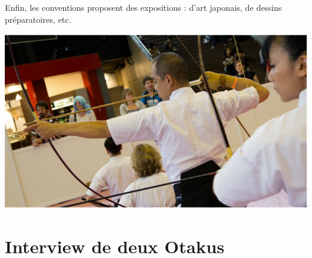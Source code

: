 \paragraph{}
Enfin, les conventions proposent des expositions : d’art japonais, de dessins préparatoires, etc.
\begin{center}
\includegraphics[scale=0.4]{demo.png}
\end{center}
\chapter{Interview de deux Otakus}
